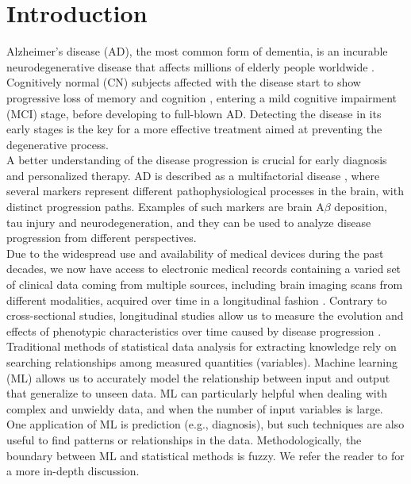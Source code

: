 \section{Introduction}

Alzheimer's disease (AD), the most common form of dementia, is an incurable neurodegenerative disease that affects millions of elderly people worldwide \cite{Ferri2005,Prince2013}. Cognitively normal (CN) subjects affected with the disease start to show progressive loss of memory and cognition \cite{Backman2004}, entering a mild cognitive impairment (MCI) stage, before developing to full-blown AD. Detecting the disease in its early stages is the key for a more effective treatment aimed at preventing the degenerative process.  \\

A better understanding of the disease progression is crucial for early diagnosis and personalized therapy. AD is described as a multifactorial disease \cite{Jack2010}, where several markers represent different pathophysiological processes in the brain, with distinct progression paths. Examples of such markers are brain A$\beta$ deposition, tau injury and neurodegeneration, and they can be used to analyze disease progression from different perspectives. \\ 

Due to the widespread use and availability of medical devices during the past decades, we now have access to electronic medical records containing a varied set of clinical data coming from multiple sources, including brain imaging scans from different modalities, acquired over time in a longitudinal fashion \cite{Lawrence2017}.  Contrary to cross-sectional studies, longitudinal studies allow us to measure the evolution and effects of phenotypic characteristics over time caused by disease progression \cite{Mills2014}. \\

Traditional methods of statistical data analysis for extracting knowledge rely on searching relationships among measured quantities (variables). Machine learning (ML) allows us to accurately model the relationship between input and output that generalize to unseen data. ML can particularly helpful when dealing with complex and unwieldy data, and when the number of input variables is large. One application of ML is prediction (e.g., diagnosis), but such techniques are also useful to find patterns or relationships in the data. Methodologically, the boundary between ML and statistical methods is fuzzy. We refer the reader to \cite{Breiman2001,Shmueli2010} for a more in-depth discussion. \\

